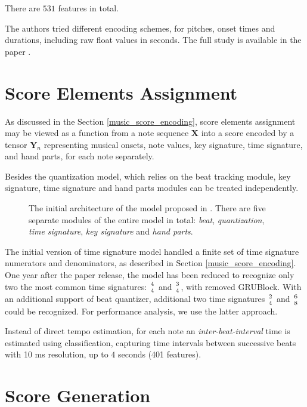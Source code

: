 There are $531$ features in total.

The authors tried different encoding schemes, for pitches, onset times and durations, including raw float values in seconds. The full study is available in the paper \cite{Liu2022}.

\section{Score Elements Assignment}

As discussed in the Section \ref{music_score_encoding}, score elements assignment may be viewed as a function from a note sequence $\mathbf{X}$ into a score encoded by a tensor $\mathbf{Y}_n$ representing musical onsets, note values, key signature, time signature, and hand parts, for each note separately.

Besides the quantization model, which relies on the beat tracking module, key signature, time signature and hand parts modules can be treated independently.

\begin{figure}[!ht]
\centering

\caption[The initial architecture of the model.]{The initial architecture of the model proposed in \cite{Liu2022}. There are five separate modules of the entire model in total: \emph{beat}, \emph{quantization}, \emph{time signature}, \emph{key signature} and \emph{hand parts}.}
\end{figure}

The initial version of time signature model handled a finite set of time signature numerators and denominators, as described in Section \ref{music_score_encoding}. One year after the paper release, the model has been reduced to recognize only two the most common time signatures: ${4 \atop 4}$ and ${3 \atop 4}$, with removed GRUBlock. With an additional support of beat quantizer, additional two time signatures ${2 \atop 4}$ and ${6 \atop 8}$ could be recognized.  For performance analysis, we use the latter approach.

Instead of direct tempo estimation, for each note an \emph{inter-beat-interval} time is estimated using classification, capturing time intervals between successive beats with 10 ms resolution, up to $4$ seconds (401 features).

\section{Score Generation}

